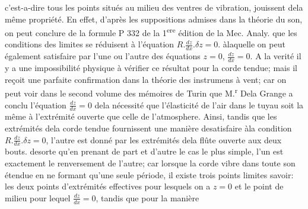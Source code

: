 \documentclass[11pt,a4paper]{article}
\begin{document}
c'est-a-dire tous les points situés au milieu des ventres de
vibration, jouissent dela même propriété. En effet, d'après
les suppositions admises dans la théorie du son, on peut conclure
de la formule P 332 de la 1\textsuperscript{ere} édition de la Mec. Analy.
que les conditions des limites se réduisent à l'équation
$R.\frac{dz}{dx}.\delta z = 0$. àlaquelle on peut également satisfaire par
l'une ou l'autre des équations $z = 0$, $\frac{dz}{dx} = 0$. A la verité
il y a une impossibilité physique à vérifier ce résultat pour
la corde tendue; mais il reçoit une parfaite confirmation
dans la théorie des instrumens à vent; car on peut voir dans
le second volume des mémoires de Turin que M.\textsuperscript{r} Dela
Grange a conclu l'équation $\frac{dz}{dx} = 0$ dela nécessité
que l'élasticité de l'air dans le tuyau soit la même
à l'extrémité ouverte que celle de l'atmosphere. Ainsi,
tandis que les extrémités dela corde tendue fournissent une
manière desatisfaire àla condition $R.\frac{dz}{dx}.\delta z = 0$, l'autre est
donné par les extrémités dela flûte ouverte aux deux bouts.
desorte qu'en prenant de part et d'autre le cas le
plus simple, l'un est exactement le renversement de
l'autre; car lorsque la corde vibre dans toute son étendue
en ne formant qu'une seule période, il existe trois points
  limites savoir: les deux points d'extrémités
effectives  pour lesquels on a $z = 0$ et le point de
milieu pour lequel $\frac{dz}{dx} = 0$, tandis que pour la manière
\end{document}
